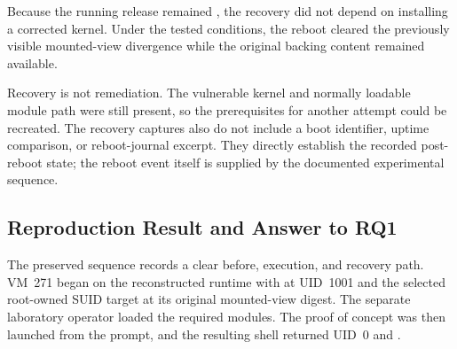 Because the running release remained , the recovery did
not depend on installing a corrected kernel. Under the tested conditions, the
reboot cleared the previously visible mounted-view divergence while the
original backing content remained available.

Recovery is not remediation. The vulnerable kernel and normally loadable module
path were still present, so the prerequisites for another attempt could be
recreated. The recovery captures also do not include a boot identifier, uptime
comparison, or reboot-journal excerpt. They directly establish the recorded
post-reboot state; the reboot event itself is supplied by the documented
experimental sequence.

\subsection{Reproduction Result and Answer to RQ1}

The preserved sequence records a clear before, execution, and recovery path.
VM~271 began on the reconstructed  runtime with
 at UID~1001 and the selected root-owned SUID target at its
original mounted-view digest. The separate laboratory operator loaded the
required modules. The proof of concept was then launched from the
 prompt, and the resulting shell returned UID~0 and
.

